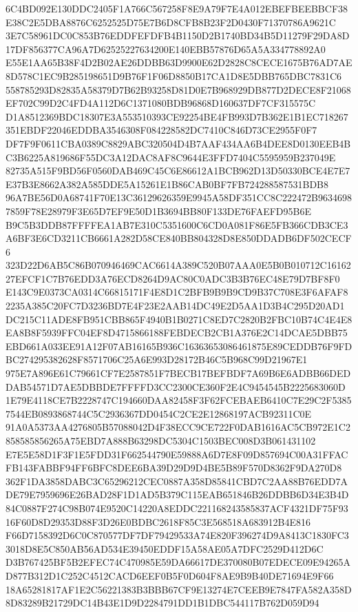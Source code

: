 \documentclass[UTF8,fontset=fandol,zihao=-4,a4paper]{ctexart}
\begin{document}
{{6C4BD092E130DDC2405F1A766C567258F8E9A79F7E4A012EBEFBEEBBCF38E38C2E5DBA8876C6252525D75E7B6D8CFB8B23F2D0430F71370786A9621C
3E7C58961DC0C853B76EDDFEFDFB4B1150D2B1740BD34B5D11279F29DA8D17DF856377CA96A7D62525227634200E140EBB57876D65A5A334778892A0
E55E1AA65B38F4D2B02AE26DDBB63D9900E62D2828C8CECE1675B76AD7AE8D578C1EC9B285198651D9B76F1F06D8850B17CA1D8E5DBB765DBC7831C6
558785293D82835A58379D7B62B93258D81D0E7B968929DB877D2DECE8F21068EF702C99D2C4FD4A112D6C1371080BDB96868D160637DF7CF315575C
D1A8512369BDC18307E3A553510393CE92254BE4FB993D7B362E1B1EC718267351EBDF22046EDDBA3546308F084228582DC7410C846D73CE2955F0F7
DF7F9F0611CBA0389C8829ABC320504D4B7AAF434AA6B4DEE8D0130EEB4BC3B6225A819686F55DC3A12DAC8AF8C9644E3FFD7404C5595959B237049E
82735A515F9BD56F0560DAB469C45C6E86612A1BCB962D13D50330BCE4E7E7E37B3E8662A382A585DDE5A15261E1B86CAB0BF7FB724288587531BDB8
96A7BE56D0A68741F70E13C36129626359E9945A58DF351CC8C222472B96346987859F78E28979F3E65D7EF9E50D1B3694BB80F133DE76FAEFD95B6E
B9C5B3DDB87FFFFEA1AB7E310C5351600C6CD0A081F86E5FB366CDB3CE3A6BF3E6CD3211CB6661A282D58CE840BB804328D8E850DDADB6DF502CECF6
323D22D6AB5C86B070946469CAC6614A389C520B07AAA0E5B0B010712C1616227EFCF1C7B76EDD3A76ECD8264D9AC80C0ADC3B3B76EC48E79D7BF8F0
E143C9E0373CA0314C66815171F4E8D1C2BFB9B9B9CD9B37C708E3F6AFAF82235A385C20FC7D3236BD7E4F23E2AAB14DC49E2D5AA1D3B4C295D20AD1
DC215C11ADE8FB951CBB865F4940B1B0271C8ED7C2820B2FBC10B74C4E4E8EA8B8F5939FFC04EF8D4715866188FEBDECB2CB1A376E2C14DCAE5DBB75
EBD661A033EE91A12F07AB16165B936C16363653086461875E89CEDDB76F9FDBC274295382628F8571706C25A6E993D28172B46C5B968C99D21967E1
975E7A896E61C79661CF7E2587851F7BECB17BEFBDF7A69B6E6ADBB66DEDDAB54571D7AE5DBBDE7FFFFD3CC2300CE360F2E4C9454545B2225683060D
1E79E4118CE7B2228747C194660DAA82458F3F62FCEBAEB6410C7E29C2F53857544EB0893868744C5C2936367DD0454C2CE2E12868197ACB92311C0E
91A0A5373AA4276805B57088042D4F38ECC9CE722F0DAB1616AC5CB972E1C2858585856265A75EBD7A888B63298DC5304C1503BEC008D3B061431102
E7E5E58D1F3F1E5FDD31F662544790E59888A6D7E8F09D857694C00A31FFACFB143FABBF94FF6BFC8DEE6BA39D29D9D4BE5B89F570D8362F9DA270D8
362F1DA3858DABC3C65296212CEC0887A358D85841CBD7C2AA88B76EDD7ADE79E7959696E26BAD28F1D1AD5B379C115EAB651846B26DDBB6D34E3B4D
84C0887F274C98B074E9520C14220A8EDDC221168243585837ACF4321DF75F9316F60D8D29353D88F3D26E0BDBC2618F85C3E568518A683912B4E816
F66D7158392D6C0C870577DF7DF79429533A74E820F396274D9A8413C1830FC33018D8E5C850AB56AD534E39450EDDF15A58AE05A7DFC2529D412D6C
D3B767425BF5B2EFEC74C470985E59DA66617DE370080B07EDECE09E94265AD877B312D1C252C4512CACD6EEF0B5F0D604F8AE9B9B40DE71694E9F66
18A65281817AF1E2C56221383B3BBB67CF9E13274E7CEEB9E7847FA582A358D8D83289B21729DC14B43E1D9D2284791DD1B1DBC544117B762D059D94
}}
\end{document}
